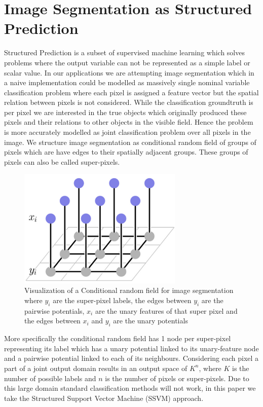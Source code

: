 \section{Image Segmentation as Structured Prediction}
Structured Prediction is a subset of supervised machine learning which solves problems where the output variable can not be represented as a simple label or scalar value. In our applications we are attempting image segmentation which in a naive implementation could be modelled as massively single nominal variable classification problem where each pixel is assigned a feature vector but the spatial relation between pixels is not considered.  While the classification groundtruth is per pixel we are interested in the true objects which originally produced these pixels and their relations to other objects in the visible field. Hence the problem is more accurately modelled as joint classification problem over all pixels in the image. We structure image segmentation as conditional random field of groups of pixels which are have edges to their spatially adjacent groups. These groups of pixels can also be called super-pixels.
\begin{figure}
  \centering
  \includegraphics[width=0.7\textwidth,natwidth=610,natheight=642]{images/crfImage.png}
  \caption{Visualization of a Conditional random field for image segmentation where $y_i$ are the super-pixel labels, the edges between $y_i$ are the pairwise potentials, $x_i$ are the unary features of that super pixel and the edges between $x_i$ and $y_i$ are the unary potentials} 
  \label{fig:crfgraphic}
\end{figure} 

\par  More specifically the conditional random field has 1 node per super-pixel representing its label which has a unary potential linked to its unary-feature node and a pairwise potential linked to each of its neighbours. Considering each pixel a part of a joint output domain results in an output space of $K^n$, where $K$ is the number of possible labels and $n$ is the number of pixels or super-pixels. Due to this large domain standard classification methods will not work, in this paper we take the Structured Support Vector Machine (SSVM) approach. 
